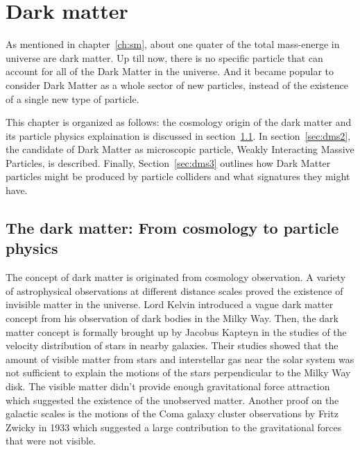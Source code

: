 \chapter{Dark matter}
\label{ch:dm}
\par As mentioned in chapter~\ref{ch:sm}, about one quater of the total mass-energe in universe are dark matter. Up till now, there is no specific particle that can account for all of the Dark Matter in the universe. And it became popular to consider Dark Matter as a whole sector of new particles, instead of the existence of a single new type of particle.

\par This chapter is organized as follows: the cosmology origin of the dark matter and its particle physics explaination is discussed in section~\ref{sec:dms1}. In section~\ref{sec:dms2}, the candidate of Dark Matter as microscopic particle, Weakly Interacting Massive Particles, is described. Finally, Section~\ref{sec:dms3} outlines how Dark Matter particles might be produced by particle colliders and what signatures they might have.

\section{The dark matter: From cosmology to particle physics}
\label{sec:dms1}

\par The concept of dark matter is originated from cosmology observation. A variety of astrophysical observations at different distance scales proved the existence of invisible matter in the universe. Lord Kelvin introduced a vague dark matter concept from his observation of dark bodies in the Milky Way. Then, the dark matter concept is formally brought up by Jacobus Kapteyn in the studies of the velocity distribution of stars in nearby galaxies\cite{Kapteyn:1922zz}. Their studies showed that the amount of visible matter from stars and interstellar gas near the solar system was not sufficient to explain the motions of the stars perpendicular to the Milky Way disk. The visible matter didn't provide enough gravitational force attraction which suggested the existence of the unobserved matter. Another proof on the galactic scales is the motions of the Coma galaxy cluster observations by Fritz Zwicky in 1933\cite{Zwicky:1933gu} which suggested a large contribution to the gravitational forces that were not visible.

